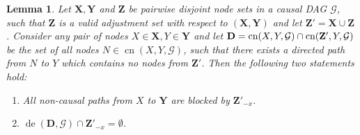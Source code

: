 \documentclass[11pt,a4paper]{article}
\newtheorem{Lemma}[Satz]{Lemma}
\theoremstyle{definition}
\theoremstyle{remark}
\DeclareMathOperator{\de}{de}
\DeclareMathOperator{\CN}{cn}
\newcommand{\g}[1][G]{\mathcal{#1}}
\newcommand{\cn}[2][X,Y]{\CN(#1,#2)}
\begin{document}
%
%	
%	
%
%

\begin{Lemma}
	Let $\mathbf{X},\mathbf{Y}$ and $\mathbf{Z}$ be pairwise disjoint node sets in a causal DAG $\g$, such that $\mathbf{Z}$ is a valid adjustment set with respect to $(\mathbf{X},\mathbf{Y})$ and let $\mathbf{Z'}=\mathbf{X} \cup \mathbf{Z}$. Consider any pair of nodes $X\in \mathbf{X}, Y \in \mathbf{Y}$ and let $\mathbf{D}=\textup{cn}(X,Y,\g) \cap \textup{cn}(\mathbf{Z'},Y,\g)$ be the set of all nodes $N \in \cn{\g}$, such that there exists a directed path from $N$ to $Y$ which contains no nodes from $\mathbf{Z'}$.
	Then the following two statements hold:
	\begin{enumerate}
		\item All non-causal paths from $X$ to $\mathbf{Y}$ are blocked by $\mathbf{Z'}_{-x}$. \label{block}
		\item $\de(\mathbf{D},\g) \cap \mathbf{Z'}_{-x} =\emptyset$. \label{specialforb}
	\end{enumerate}
	

	\label{lemma:specialZ}
\end{Lemma}
\end{document}
